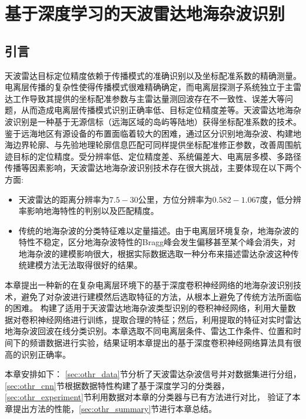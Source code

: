 
\chapter{基于深度学习的天波雷达地海杂波识别}
\label{sec:othr}
\section{引言}

天波雷达目标定位精度依赖于传播模式的准确识别以及坐标配准系数的精确测量。电离层传播的复杂性使得传播模式很难精确确定，而电离层探测子系统独立于主雷达工作导致其提供的坐标配准参数与主雷达量测回波存在不一致性、误差大等问题，从而造成电离层传播模式识别正确率低、目标定位精度差等。天波雷达地海杂波识别是一种基于无源信标（远海区域的岛屿等陆地）获得坐标配准系数的技术。鉴于远海地区有源设备的布置面临着较大的困难，通过区分识别地海杂波、构建地海边界轮廓、与先验地理轮廓信息匹配可同样提供坐标配准修正参数，改善周围航迹目标的定位精度。受分辨率低、定位精度差、系统偏差大、电离层多模、多路径传播等因素影响，天波雷达地海杂波识别技术存在很大挑战，主要体现在以下两个方面:
\begin{itemize}
\item 天波雷达的距离分辨率为$7.5-30$公里，方位分辨率为$0.582-1.067$度，低分辨率影响地海特性的判别以及匹配精度。
\item 传统的地海杂波的分类特征难以定量描述。由于电离层环境复杂，地海杂波的特性不稳定，区分地海杂波特性的Bragg峰会发生偏移甚至某个峰会消失，对地海杂波的建模影响很大，根据实际数据选取一种分布来描述雷达杂波这种传统建模方法无法取得很好的结果。
\end{itemize}

本章提出一种新的在复杂电离层环境下的基于深度卷积神经网络的地海杂波识别技术，避免了对杂波进行建模然后选取特征的方法，从根本上避免了传统方法所面临的困难。
构建了适用于天波雷达地海杂波类型识别的卷积神经网络，利用大量数据对卷积神经网络进行训练，提取合理的特征；然后，利用提取的特征对实时雷达地海杂波回波在线分类识别。本章选取不同电离层条件、雷达工作条件、位置和时间下的频谱数据进行实验，结果证明本章提出的基于深度卷积神经网络算法具有很高的识别正确率。

本章安排如下： \ref{sec:othr_data}节分析了天波雷达杂波信号并对数据集进行分组，\ref{sec:othr_cnn}节根据数据特性构建了基于深度学习的分类器，\ref{sec:othr_experiment}节利用数据对本章的分类器与已有方法进行对比，
验证了本章提出方法的性能，\ref{sec:othr_summary}节进行本章总结。

